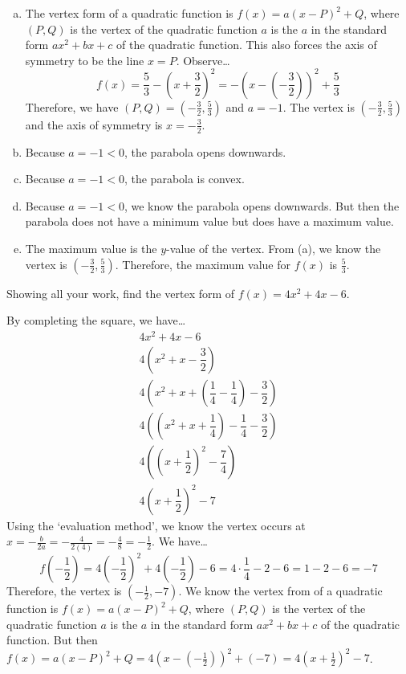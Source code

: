 \documentclass[12pt,letterpaper]{exam}
\begin{document}
\begin{questions}
\sol 
\begin{enumerate}[(a)]
\item The vertex form of a quadratic function is $f(x)= a(x - P)^2 + Q$, where $(P, Q)$ is the vertex of the quadratic function $a$ is the $a$ in the standard form $ax^2 + bx + c$ of the quadratic function. This also forces the axis of symmetry to be the line $x= P$. Observe\dots
	\[
	f(x)= \dfrac{5}{3} - \left(x + \dfrac{3}{2} \right)^2= -\left(x - \left(- \dfrac{3}{2} \right) \right)^2 + \dfrac{5}{3}
	\]
Therefore, we have $(P, Q)= (-\frac{3}{2}, \frac{5}{3})$ and $a= -1$. The vertex is $(-\frac{3}{2}, \frac{5}{3})$ and the axis of symmetry is $x= -\frac{3}{2}$. \pspace

\item Because $a= -1 < 0$, the parabola opens downwards. \pspace 

\item Because $a= -1 < 0$, the parabola is convex. \pspace

\item Because $a= -1 < 0$, we know the parabola opens downwards. But then the parabola does not have a minimum value but does have a maximum value. \pspace

\item The maximum value is the $y$-value of the vertex. From (a), we know the vertex is $(-\frac{3}{2}, \frac{5}{3})$. Therefore, the maximum value for $f(x)$ is $\frac{5}{3}$. 
\end{enumerate}



\newpage
\question[10] Showing all your work, find the vertex form of $f(x)= 4x^2 + 4x - 6$. \pspace

\sol By completing the square, we have\dots
	\[
	\begin{gathered}
	4x^2 + 4x - 6 \\
	4 \left(x^2 + x - \dfrac{3}{2} \right) \\
	4 \left(x^2 + x + \left(\dfrac{1}{4} - \dfrac{1}{4} \right) - \dfrac{3}{2} \right) \\
	4 \left( \left(x^2 + x + \dfrac{1}{4} \right) - \dfrac{1}{4} - \dfrac{3}{2} \right) \\
	4 \left( \left(x + \dfrac{1}{2} \right)^2 - \dfrac{7}{4} \right) \\
	4 \left(x + \dfrac{1}{2} \right)^2 - 7
	\end{gathered}
	\]
Using the `evaluation method', we know the vertex occurs at $x= -\frac{b}{2a}= -\frac{4}{2(4)}= -\frac{4}{8}= -\frac{1}{2}$. We have\dots
	\[
	f\left( -\dfrac{1}{2} \right)= 4 \left( -\dfrac{1}{2} \right)^2 + 4 \left( -\dfrac{1}{2} \right) - 6= 4 \cdot \dfrac{1}{4} - 2 - 6= 1 - 2 - 6= -7
	\]
Therefore, the vertex is $(-\frac{1}{2}, -7)$. We know the vertex from of a quadratic function is $f(x)= a(x - P)^2 + Q$, where $(P, Q)$ is the vertex of the quadratic function $a$ is the $a$ in the standard form $ax^2 + bx + c$ of the quadratic function. But then $f(x)= a (x - P)^2 + Q= 4 \left(x - (-\frac{1}{2}) \right)^2 + (-7)= 4(x + \frac{1}{2})^2 - 7$. 




\end{questions}
\end{document}
